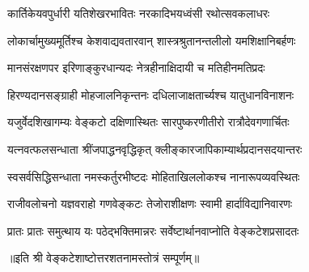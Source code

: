 \twolineshloka
{कार्तिकेयवपुर्धारी यतिशेखरभावितः}
{नरकादिभयध्वंसी रथोत्सवकलाधरः }
                                                        
\twolineshloka
{लोकार्चामुख्यमूर्तिश्च केशवाद्यवतारवान्}
{शास्त्रश्रुतानन्तलीलो यमशिक्षानिबर्हणः}
                                                            
\twolineshloka
{मानसंरक्षणपर इरिणाङ्कुरधान्यदः}
{नेत्रहीनाक्षिदायी च मतिहीनमतिप्रदः}
                                                                
\twolineshloka
{हिरण्यदानसङ्ग्राही मोहजालनिकृन्तनः}
{दधिलाजाक्षतार्च्यश्च यातुधानविनाशनः}
                                                                    
\twolineshloka
{यजुर्वेदशिखागम्यः वेङ्कटो दक्षिणास्थितः}
{सारपुष्करणीतीरो रात्रौदेवगणार्चितः}
                                                                        
\twolineshloka
{यत्नवत्फलसन्धाता श्रींजपाद्धनवृद्धिकृत्}
{क्लीङ्कारजापिकाम्यार्थप्रदानसदयान्तरः}
                                                                            
\twolineshloka
{स्वसर्वसिद्धिसन्धाता नमस्कर्तुरभीष्टदः}
{मोहिताखिललोकश्च नानारूपव्यवस्थितः}
                                                                                
\twolineshloka
{राजीवलोचनो यज्ञवराहो गणवेङ्कटः}
{तेजोराशीक्षणः स्वामी हार्दाविद्यानिवारणः}
                                                                                    
{प्रातः प्रातः  समुत्थाय  यः  पठेद्भक्तिमान्नरः}
{सर्वेष्टार्थानवाप्नोति  वेङ्कटेशप्रसादतः}

॥इति  श्री  वेङ्कटेशाष्टोत्तरशतनामस्तोत्रं  सम्पूर्णम्॥